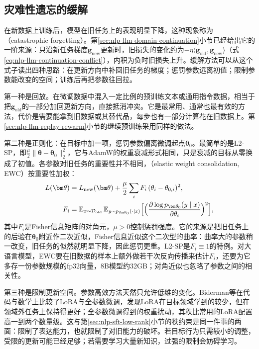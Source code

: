 \subsection{灾难性遗忘的缓解}
\label{sec:nlp-sft-forgetting}

在新数据上训练后，模型在旧任务上的表现明显下降，这种现象称为（catastrophic forgetting）。第\ref{sec:nlp-llm-domain-continuation}小节已经给出它的一阶来源：只沿新任务梯度$\bm g_{\mathrm{new}}$更新时，旧损失的变化约为$-\eta\langle\bm g_{\mathrm{old}},\bm g_{\mathrm{new}}\rangle$（式\eqref{eq:nlp-llm-continuation-conflict}），内积为负时旧损失上升。缓解方法可以从这个式子读出四种思路：在更新方向中补回旧任务的梯度；惩罚参数远离初值；限制参数能改变的空间；训练后再把参数往回拉。

第一种是回放。在微调数据中混入一定比例的预训练文本或通用指令数据，相当于把$\bm g_{\mathrm{old}}$的一部分加回更新方向，直接抵消冲突。它是最常用、通常也最有效的方法，代价是需要能拿到旧数据或其替代品，每步也有一部分计算花在旧数据上。第\ref{sec:nlp-llm-replay-rewarm}小节的继续预训练采用同样的做法。

第二种是正则化：在目标中加一项，惩罚参数偏离微调起点$\bm\theta_0$。最简单的是L2-SP，即$\frac{\mu}{2}\lVert\bm\theta-\bm\theta_0\rVert_2^2$，它与AdamW的权重衰减形式相同，只是衰减的目标从零换成了初值。各参数对旧任务的重要性并不相同，（elastic weight consolidation, EWC）按重要性加权\cite{kirkpatrick2017ewc}：
\begin{equation}
 \begin{aligned}
 L(\bm\theta)&=L_{\mathrm{new}}(\bm\theta)+\frac{\mu}{2}\sum_{i}F_i\,(\theta_i-\theta_{0,i})^2,\\
 F_i&=\mathbb E_{x\sim\mathcal D_{\mathrm{old}}}\,\mathbb E_{y\sim p_{\bm\theta_0}(\cdot\mid x)}\Bigl[\Bigl(\frac{\partial\log p_{\bm\theta_0}(y\mid x)}{\partial\theta_i}\Bigr)^2\Bigr],
 \end{aligned}
 \label{eq:nlp-sft-ewc}
\end{equation}
其中$F_i$是Fisher信息矩阵的对角元，$\mu>0$控制惩罚强度。它的来源是把旧任务上的后验在$\bm\theta_0$附近作二次近似，Fisher信息近似这个二次型的曲率：曲率大的参数稍一改变，旧任务的似然就明显下降，因此惩罚更重。L2-SP是$F_i\equiv1$的特例。对大语言模型，EWC要在旧数据的样本上额外做若干次反向传播来估计$F_i$，还要为它多存一份参数规模的fp32向量，8B模型约32GB；对角近似也忽略了参数之间的相关性。

第三种是限制更新空间。参数高效方法天然只允许低维的变化。Biderman等在代码与数学上比较了LoRA与全参数微调，发现LoRA在目标领域学到的较少，但在领域外任务上保持得更好；全参数微调得到的权重扰动，其秩比常用的LoRA配置高一到两个数量级。这与第\ref{sec:nlp-sft-low-rank}小节的秩约束是同一件事的两面：限制了表达能力，也就限制了对旧能力的破坏。若目标行为只需较小的调整，受限的更新可能已经足够；若需要学习大量新知识，过强的限制会妨碍学习。

